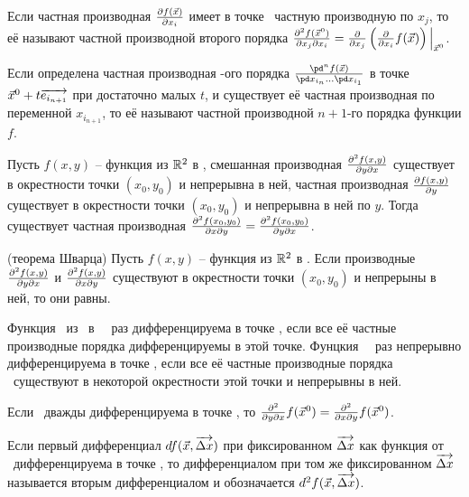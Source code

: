\documentclass[unicode,10pt]{article}
\newcommand{\билет}[1]{\par\medskip\noindent{\large \textsf{Билет #1.}}\par}
\begin{document}
\begin{df} Если частная производная $\frac{\partial f(\vec x)}{\partial x_i}$ имеет в точке \ частную производную  по $x_j$, то её  называют частной производной второго порядка $\frac{\partial^2 f(\vec x^0)}{\partial x_j\partial x_i}=\frac{\partial }{\partial x_j}\left(\frac{\partial }{\partial x_i}f(\vec x)\right)\Bigl|_{\vec x^0}$.
\end{df}

\begin{df} Если определена частная производная \н-ого порядка $\frac{\pd^n f(\vec x)}{\pd x_{i_n}\bnl\pd x_{i_1}}$ в точке $\vec x^0+t\overrightarrow{e_{i_{n+1}}}$ при достаточно малых $t$, и существует её частная производная по переменной $x_{i_{n+1}}$, то её называют частной производной $n+1$-го порядка функции $f$.
\end{df}

\begin{theorem} Пусть $f(x,y)$ -- функция из $\mathbb R^2$ в , смешанная производная $\frac{\partial^2 f(x,y)}{\partial y\partial x}$ существует в окрестности точки $(x_0,y_0)$ и непрерывна в ней, частная производная $\frac{\partial f(x,y)}{\partial y}$ существует в окрестности точки $(x_0,y_0)$ и непрерывна в ней по $y$. Тогда существует частная производная $\frac{\partial^2 f(x_0,y_0)}{\partial x\partial y}=\frac{\partial^2 f(x_0,y_0)}{\partial y\partial x}$.
\end{theorem}

\begin{imp} (теорема Шварца) Пусть $f(x,y)$ -- функция из $\mathbb R^2$ в . Если производные $\frac{\partial^2 f(x,y)}{\partial y\partial x}$ и $\frac{\partial^2 f(x,y)}{\partial x\partial y}$ существуют в окрестности точки $(x_0,y_0)$ и непрерыны в ней, то они равны.
\end{imp}

\begin{df} Функция \ф\ из \ в \ \м\ раз дифференцируема в точке , если все её частные производные порядка  дифференцируемы в этой точке. Фунцкия \ф\ \м\ раз непрерывно дифференцируема в точке , если все её частные производные порядка \м\ существуют в некоторой окрестности этой точки и непрерывны в ней.
\end{df}

\begin{theorem}[Юнга] Если \ф\ дважды дифференцируема в точке , то $\frac{\partial^2 }{\partial y\partial x}f(\vec x^0)=\frac{\partial^2 }{\partial x\partial y}f(\vec x^0)$.
\end{theorem}

\begin{df} Если первый дифференциал $df(\vec x,\overrightarrow{\Delta x})$ при фиксированном $\overrightarrow{\Delta x}$ как функция от \х\ дифференцируема в точке , то дифференциалом при том же фиксированном $\overrightarrow{\Delta x}$ называется вторым дифференциалом и обозначается $d^2f(\vec x,\overrightarrow{\Delta x})$.
\end{df}
\end{document}
